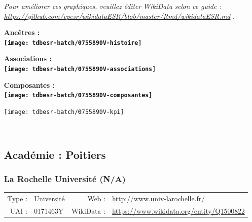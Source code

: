 \documentclass[12pt,french,]{article}
\begin{document}
\textit{\scriptsize Pour améliorer ces graphiques, veuillez éditer WikiData selon ce guide :  \href{https://github.com/cpesr/wikidataESR/blob/master/Rmd/wikidataESR.md}{https://github.com/cpesr/wikidataESR/blob/master/Rmd/wikidataESR.md}}
.

\vspace{1cm}  
\begin{minipage}[b]{0.50\textwidth}\begin{center} \bf Ancêtres : \\  
\texttt{[image: tdbesr-batch/0755890V-histoire]} \end{center}\end{minipage}\begin{minipage}[b]{0.50\textwidth}\begin{center} \bf Associations : \\  
\texttt{[image: tdbesr-batch/0755890V-associations]} \end{center}\end{minipage}

\hrulefill

\begin{center} \bf Composantes : \\  
\texttt{[image: tdbesr-batch/0755890V-composantes]} \end{center}

\begin{center}\texttt{[image: tdbesr-batch/0755890V-kpi]} \end{center}\checkoddpage

\ifoddpage \fi ~\newpage  

\hypertarget{acaduxe9mie-poitiers}{%
\subsection{Académie : Poitiers}\label{acaduxe9mie-poitiers}}

\hypertarget{la-rochelle-universituxe9-na}{%
\subsubsection{La Rochelle Université
(N/A)}\label{la-rochelle-universituxe9-na}}

\begin{tabular*}{\textwidth}{rp{5cm}rl}  
\hline  
Type : & Université & Web : &\href{http://www.univ-larochelle.fr/}{http://www.univ-larochelle.fr/} \\  
UAI : & 0171463Y & WikiData : & \href{https://www.wikidata.org/entity/Q1500822}{https://www.wikidata.org/entity/Q1500822} \\  
\hline  
\end{tabular*}
\end{document}
